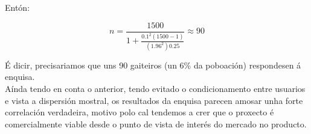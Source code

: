 Entón:

\begin{equation}
 n = \frac{1500}{1 + \frac{0.1^2(1500-1)}{(1.96^2)0.25}} \approx 90
\end{equation}

É dicir, precisariamos que uns 90 gaiteiros (un 6\% da poboación) respondesen á
enquisa. \\

Aínda tendo en conta o anterior, tendo evitado o condicionamento entre usuarios
e vista a dispersión mostral, os resultados da enquisa parecen amosar unha
forte correlación verdadeira, motivo polo cal tendemos a crer que o proxecto é
comercialmente viable desde o punto de vista de interés do mercado no producto.